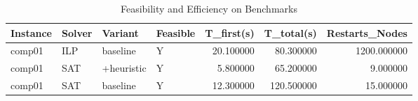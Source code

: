 \begin{table}[ht]
\centering
\caption{Feasibility and Efficiency on Benchmarks}
\label{tab:feasibility}
\begin{tabular}{llllrrr}
\toprule
Instance & Solver & Variant & Feasible & T\_first(s) & T\_total(s) & Restarts_Nodes \\
\midrule
comp01 & ILP & baseline & Y & 20.100000 & 80.300000 & 1200.000000 \\
comp01 & SAT & +heuristic & Y & 5.800000 & 65.200000 & 9.000000 \\
comp01 & SAT & baseline & Y & 12.300000 & 120.500000 & 15.000000 \\
\bottomrule
\end{tabular}
\end{table}
